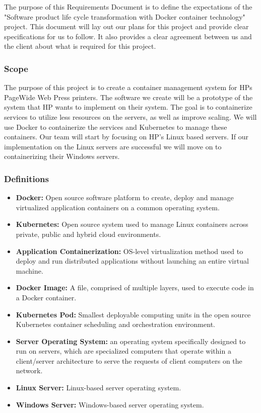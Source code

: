 \documentclass[onecolumn, draftclsnofoot,10pt, compsoc]{IEEEtran}
\begin{document}
The purpose of this Requirements Document is to define the expectations of the "Software product life cycle transformation with Docker container technology" project. 
This document will lay out our plans for this project and provide clear specifications for us to follow.
It also provides a clear agreement between us and the client about what is required for this project. 

\subsubsection{Scope}
The purpose of this project is to create a container management system for HPs PageWide Web Press printers. 
The software we create will be a prototype of the system that HP wants to implement on their system.
The goal is to containerize services to utilize less resources on the servers, as well as improve scaling. 
We will use Docker to containerize the services and Kubernetes to manage these containers. 
Our team will start by focusing on HP’s Linux based servers. If our implementation on the Linux servers are successful we will move on to containerizing their Windows servers.
	
\subsubsection{Definitions}
\begin{itemize}
    \item \textbf{Docker:} Open source software platform to create, deploy and manage virtualized application containers on a common operating system\cite{tech}.
    
\item \textbf{Kubernetes:} Open source system used to manage Linux containers across private, public and hybrid cloud environments\cite{tech}.

\item \textbf{Application Containerization:} OS-level virtualization method used to deploy and run distributed applications without launching an entire virtual machine\cite{tech}.

\item \textbf{Docker Image:} A file, comprised of multiple layers, used to execute code in a Docker container\cite{tech}.

\item \textbf{Kubernetes Pod:} Smallest deployable computing units in the open source Kubernetes container scheduling and orchestration environment\cite{tech}.

\item \textbf{Server Operating System:} an operating system specifically designed to run on servers, which are specialized computers that operate within a client/server architecture to serve the requests of client computers on the network\cite{tech}.

\item \textbf{Linux Server:} Linux-based server operating system\cite{tech}.

\item \textbf{Windows Server:} Windows-based server operating system\cite{tech}.

\end{itemize}	
\end{document}
